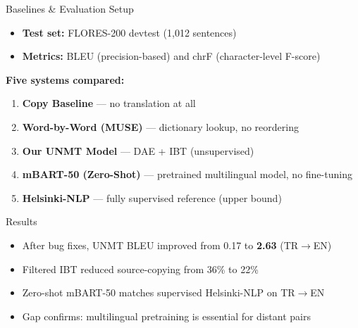 \documentclass[aspectratio=169]{beamer}
\begin{document}
\begin{frame}{Baselines \& Evaluation Setup}
  \begin{itemize}
    \item \textbf{Test set:} FLORES-200 devtest (1,012 sentences)
    \item \textbf{Metrics:} BLEU (precision-based) and chrF (character-level F-score)
  \end{itemize}
  \vfill
  \textbf{Five systems compared:}
  \begin{enumerate}
    \item \textbf{Copy Baseline} — no translation at all
    \item \textbf{Word-by-Word (MUSE)} — dictionary lookup, no reordering
    \item \textbf{Our UNMT Model} — DAE + IBT (unsupervised)
    \item \textbf{mBART-50 (Zero-Shot)} — pretrained multilingual model, no fine-tuning
    \item \textbf{Helsinki-NLP} — fully supervised reference (upper bound)
  \end{enumerate}
\end{frame}

\begin{frame}{Results}
  \begin{table}
    \centering
  \end{table}
  \vfill
  \begin{itemize}
    \item After bug fixes, UNMT BLEU improved from 0.17 to \textbf{2.63} (TR$\rightarrow$EN)
    \item Filtered IBT reduced source-copying from 36\% to 22\%
    \item Zero-shot mBART-50 matches supervised Helsinki-NLP on TR$\rightarrow$EN
    \item Gap confirms: multilingual pretraining is essential for distant pairs
  \end{itemize}
\end{frame}
\end{document}
